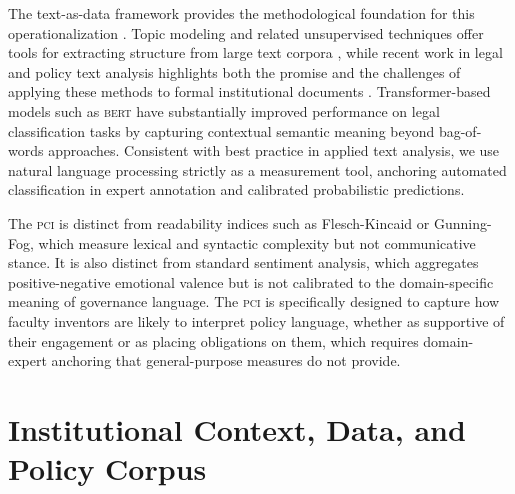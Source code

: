\documentclass[12pt]{article}
\newcommand{\PCI}{\textsc{pci}}
\newcommand{\BERT}{\textsc{bert}}
\begin{document}
The text-as-data framework provides the methodological foundation for this
operationalization \citep{Gentzkow2019, Grimmer2013}.  Topic modeling and related
unsupervised techniques offer tools for extracting structure from large text corpora
\citep{Blei2003}, while recent work in legal and policy text analysis highlights both
the promise and the challenges of applying these methods to formal institutional
documents \citep{Boella2019, Chalkidis2019, Jin2023}.  Transformer-based models such
as \BERT{} \citep{Devlin2019} have substantially improved performance on legal
classification tasks by capturing contextual semantic meaning beyond bag-of-words
approaches.  Consistent with best practice in applied text analysis, we use natural
language processing strictly as a measurement tool, anchoring automated classification
in expert annotation and calibrated probabilistic predictions.

The \PCI{} is distinct from readability indices such as Flesch-Kincaid or
Gunning-Fog, which measure lexical and syntactic complexity but not communicative
stance.  It is also distinct from standard sentiment analysis, which aggregates
positive-negative emotional valence but is not calibrated to the domain-specific
meaning of governance language.  The \PCI{} is specifically designed to capture how
faculty inventors are likely to interpret policy language, whether as supportive of
their engagement or as placing obligations on them, which requires domain-expert
anchoring that general-purpose measures do not provide.

\section{Institutional Context, Data, and Policy Corpus}
\end{document}
